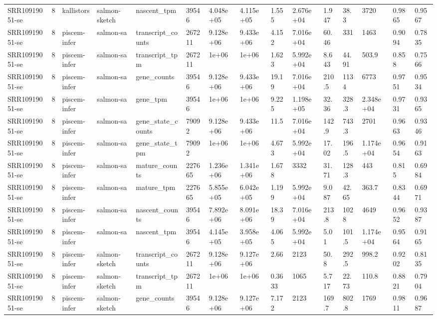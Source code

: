 \begin{tabular}{lllllllllllllll}
SRR10919051-se & 8 & kallistors & salmon-sketch & nascent\_tpm & 39546 & 4.048e+05 & 4.115e+05 & 1.555 & 2.676e+04 & 1.947 & 38.3 & 3720 & 0.9865 & 0.9567 \\
SRR10919051-se & 8 & piscem-infer & salmon-sa & transcript\_counts & 267211 & 9.128e+06 & 9.433e+06 & 4.152 & 7.016e+04 & 60.46 & 331 & 1463 & 0.9094 & 0.7835 \\
SRR10919051-se & 8 & piscem-infer & salmon-sa & transcript\_tpm & 267211 & 1e+06 & 1e+06 & 1.623 & 5.992e+04 & 8.643 & 44.91 & 503.9 & 0.858 & 0.7566 \\
SRR10919051-se & 8 & piscem-infer & salmon-sa & gene\_counts & 39546 & 9.128e+06 & 9.433e+06 & 19.19 & 7.016e+04 & 210.5 & 1134 & 6773 & 0.9751 & 0.9534 \\
SRR10919051-se & 8 & piscem-infer & salmon-sa & gene\_tpm & 39546 & 1e+06 & 1e+06 & 9.225 & 1.198e+05 & 32.36 & 328.3 & 2.348e+04 & 0.9731 & 0.9365 \\
SRR10919051-se & 8 & piscem-infer & salmon-sa & gene\_state\_counts & 79092 & 9.128e+06 & 9.433e+06 & 11.5 & 7.016e+04 & 142.9 & 743.3 & 2701 & 0.9663 & 0.9346 \\
SRR10919051-se & 8 & piscem-infer & salmon-sa & gene\_state\_tpm & 79092 & 1e+06 & 1e+06 & 4.673 & 5.992e+04 & 17.02 & 196.5 & 1.174e+04 & 0.9654 & 0.9163 \\
SRR10919051-se & 8 & piscem-infer & salmon-sa & mature\_counts & 227665 & 1.236e+06 & 1.341e+06 & 1.678 & 3332 & 31.71 & 128.3 & 443 & 0.815 & 0.6984 \\
SRR10919051-se & 8 & piscem-infer & salmon-sa & mature\_tpm & 227665 & 5.855e+05 & 6.042e+05 & 1.199 & 5.992e+04 & 9.087 & 42.65 & 363.7 & 0.8344 & 0.6971 \\
SRR10919051-se & 8 & piscem-infer & salmon-sa & nascent\_counts & 39546 & 7.892e+06 & 8.091e+06 & 18.39 & 7.016e+04 & 213.8 & 1028 & 4649 & 0.9652 & 0.9387 \\
SRR10919051-se & 8 & piscem-infer & salmon-sa & nascent\_tpm & 39546 & 4.145e+05 & 3.958e+05 & 4.065 & 5.992e+04 & 5.01 & 101.5 & 1.174e+04 & 0.9564 & 0.9165 \\
SRR10919051-se & 8 & piscem-infer & salmon-sketch & transcript\_counts & 267211 & 9.128e+06 & 9.127e+06 & 2.66 & 2123 & 50.8 & 292.5 & 998.2 & 0.9202 & 0.8135 \\
SRR10919051-se & 8 & piscem-infer & salmon-sketch & transcript\_tpm & 267211 & 1e+06 & 1e+06 & 0.3633 & 1065 & 5.717 & 22.73 & 110.8 & 0.8821 & 0.7904 \\
SRR10919051-se & 8 & piscem-infer & salmon-sketch & gene\_counts & 39546 & 9.128e+06 & 9.127e+06 & 7.172 & 2123 & 169.7 & 802.8 & 1769 & 0.9811 & 0.9687 \\

\end{tabular}
